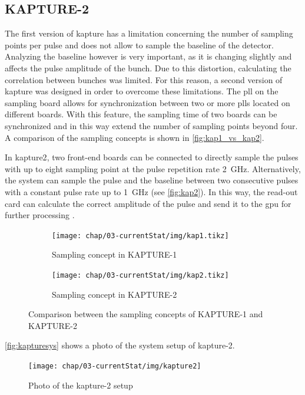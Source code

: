\subsection{KAPTURE-2}
The first version of \gls{kapture} has a limitation concerning the number of sampling points per pulse and does not allow to sample the baseline of the detector.
Analyzing the baseline however is very important, as it is changing slightly and affects the pulse amplitude of the bunch. 
Due to this distortion, calculating the correlation between bunches was limited. 
For this reason, a second version of \gls{kapture} was designed in order to overcome these limitations. 
The \gls{pll} on the sampling board allows for synchronization between two or more \glspl{pll} located on different boards.
With this feature, the sampling time of two boards can be synchronized and in this way extend the number of sampling points beyond four.
A comparison of the sampling concepts is shown in \autoref{fig:kap1_vs_kap2}.

In \gls{kapture2}, two front-end boards can be connected to directly sample the pulses with up to eight sampling point at the pulse repetition rate \SI{2}{\GHz}. 
Alternatively, the system can sample the pulse and the baseline between two consecutive pulses with a constant pulse rate up to \SI{1}{\GHz} (see \autoref{fig:kap2}).
In this way, the read-out card can calculate the correct amplitude of the pulse and send it to the \gls{gpu} for further processing \cite{caselleKAP}.

\begin{figure}[tbh]
	\centering
	\begin{subfigure}{0.48\textwidth}
		\centering
		\texttt{[image: chap/03-currentStat/img/kap1.tikz]}  
		\caption{Sampling concept in KAPTURE-1}
		\label{fig:kap1}
	\end{subfigure}
	\hfill
	\begin{subfigure}{0.48\textwidth}
		\centering
		\texttt{[image: chap/03-currentStat/img/kap2.tikz]}  
		\caption{Sampling concept in KAPTURE-2}
		\label{fig:kap2}
	\end{subfigure}
	\caption[Comparison between KAPTURE-1 and KAPTURE-2]{Comparison between the sampling concepts of KAPTURE-1 and KAPTURE-2}
	\label{fig:kap1_vs_kap2}
\end{figure}


\autoref{fig:kapturesys} shows a photo of the system setup of \gls{kapture}-2.

\begin{figure}[tbh]
	\centering
	\texttt{[image: chap/03-currentStat/img/kapture2]}
	\caption[Photo of KAPTURE-2 system]{Photo of the \gls{kapture}-2 setup}
	\label{fig:kapturesys}
\end{figure}



